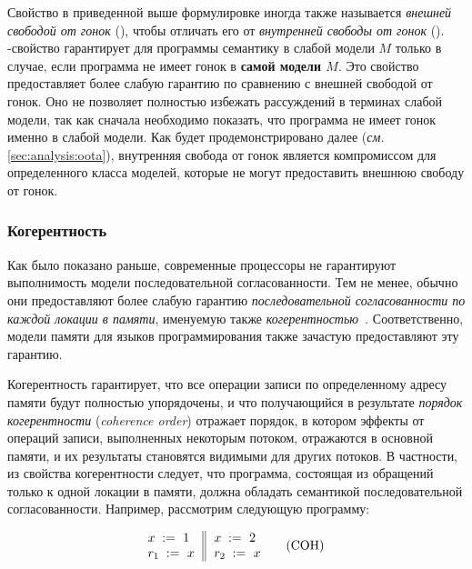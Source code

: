 Свойство \DRF в приведенной  выше формулировке иногда также называется
\emph{внешней свободой от гонок} (\eDRF), 
чтобы отличать его от \emph{внутренней свободы от гонок} (\iDRF).
\iDRF-свойство гарантирует для программы семантику \SC
в слабой модели $M$ только в случае, если программа 
не имеет гонок в \textbf{самой модели $M$}.
Это свойство предоставляет более слабую гарантию
по сравнению с внешней свободой от гонок. 
Оно не позволяет полностью избежать рассуждений 
в терминах слабой модели, так как 
сначала необходимо показать, что программа не имеет гонок именно в слабой модели. 
Как будет продемонстрировано далее (\emph{см.} \cref{sec:analysis:oota}), 
внутренняя свобода от гонок является компромиссом 
для определенного класса моделей, которые не могут 
предоставить внешнюю свободу от гонок. 

\subsubsection{Когерентность}
\label{sec:background:coh}

Как было показано раньше, современные процессоры
не гарантируют выполнимость модели последовательной согласованности. 
Тем не менее, обычно они предоставляют более слабую 
гарантию \emph{последовательной согласованности 
по каждой локации в памяти}, именуемую также 
\emph{когерентностью}~\cite{Alglave-al:TOPLAS14}. 
Соответственно, модели памяти 
для языков программирования также зачастую предоставляют эту гарантию.

Когерентность гарантирует, что все операции записи 
по определенному адресу памяти будут полностью упорядочены,
и что получающийся в результате \emph{порядок когерентности} 
(\emph{coherence order}) отражает порядок, 
в котором эффекты от операций записи, выполненных некоторым потоком, 
отражаются в основной памяти, и их результаты становятся видимыми для других потоков.
В частности, из свойства когерентности следует, 
что программа, состоящая из обращений только 
к одной локации в памяти, должна 
обладать семантикой последовательной согласованности.
Например, рассмотрим следующую программу:

\begin{equation*}
\inarrII{
   \writeInst{}{x}{1}   \\
   \readInst{}{r_1}{x}  \\
}{
   \writeInst{}{x}{2}   \\
   \readInst{}{r_2}{x}  \\
}
\tag{COH}\label{ex:coh}
\end{equation*}

